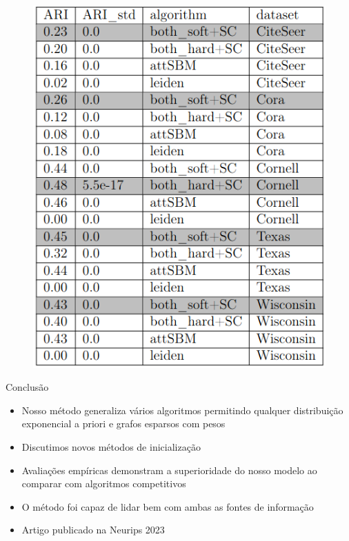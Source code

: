 \documentclass[aspectratio=169]{beamer}
\begin{document}
\begin{frame}
	\begin{figure}
		\includegraphics[scale=0.35]{img/comparison_table.png}
	\end{figure}

\end{frame}

\begin{frame}{Conclusão}
    \begin{itemize}
        \item Nosso método generaliza vários algoritmos permitindo qualquer distribuição exponencial a priori e grafos esparsos com pesos
        \item Discutimos novos métodos de inicialização
        \item Avaliações empíricas demonstram a superioridade do nosso modelo ao comparar com algoritmos competitivos 
        \item O método foi capaz de lidar bem com ambas as fontes de informação
        \item Artigo publicado na Neurips 2023
    \end{itemize}
\end{frame}
\end{document}
